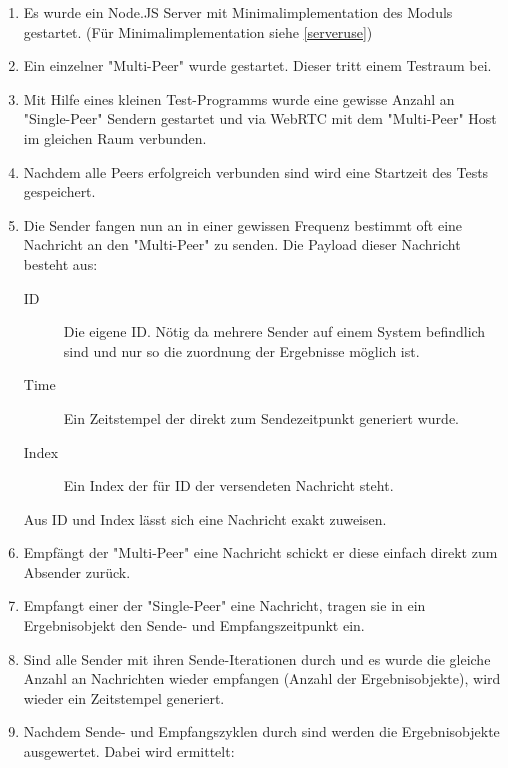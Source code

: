 \begin{enumerate}
\item
Es wurde ein Node.JS Server mit Minimalimplementation des Moduls gestartet. (Für Minimalimplementation siehe \ref{serveruse})

\item
Ein einzelner "Multi-Peer" wurde gestartet. Dieser tritt einem Testraum bei.

\item
Mit Hilfe eines kleinen Test-Programms wurde eine gewisse Anzahl an "Single-Peer" Sendern gestartet und via WebRTC mit dem "Multi-Peer" Host im gleichen Raum verbunden.

\item
Nachdem alle Peers erfolgreich verbunden sind wird eine Startzeit des Tests gespeichert.

\item
Die Sender fangen nun an in einer gewissen Frequenz bestimmt oft eine Nachricht an den "Multi-Peer" zu senden.
Die Payload dieser Nachricht besteht aus:
  \begin{description}
  \item[ID]
  Die eigene ID. Nötig da mehrere Sender auf einem System befindlich sind und nur so die zuordnung der Ergebnisse möglich ist.
  
  \item[Time]
  Ein Zeitstempel der direkt zum Sendezeitpunkt generiert wurde.
  
  \item[Index]
  Ein Index der für ID der versendeten Nachricht steht.
  \end{description}

Aus ID und Index lässt sich eine Nachricht exakt zuweisen.

\item
Empfängt der "Multi-Peer" eine Nachricht schickt er diese einfach direkt zum Absender zurück.

\item
Empfangt einer der "Single-Peer" eine Nachricht, tragen sie in ein Ergebnisobjekt den Sende- und Empfangszeitpunkt ein.

\item
Sind alle Sender mit ihren Sende-Iterationen durch und es wurde die gleiche Anzahl an Nachrichten wieder empfangen (Anzahl der Ergebnisobjekte), wird wieder ein Zeitstempel generiert.

\item
Nachdem Sende- und Empfangszyklen durch sind werden die Ergebnisobjekte ausgewertet. Dabei wird ermittelt:


\end{enumerate}
